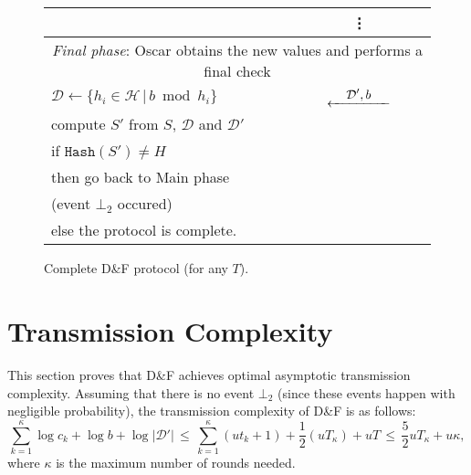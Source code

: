 \documentclass[twoside,envcountsame,runningheads]{llncs}
\newcommand{\Set}{\mathcal{H}}
\newcommand{\SetD}{\mathcal{D}}
\newcommand{\df}{D\&F\xspace}
\newcommand{\Hash}{\ensuremath{\mathtt{Hash}}}
\newcommand{\Lflow}[1]{\stackrel{\displaystyle #1}{\hbox to 5em{\leftarrowfill}}}
\newcommand{\apref}[1]{Appendix~\ref{#1}}
\newcommand{\apref}[1]{the full version~TODO}
\begin{document}
\begin{figure}[t]
\begin{tabular}{p{}cp{}}
 & \vdots & \\
\midrule
\multicolumn{3}{c}{\textit{Final phase}: Oscar obtains the new values and performs a final check } \\
\midrule
$\SetD \gets \{ h_i \in \Set \,|\, b \bmod h_i \}$ & $\Lflow{\SetD',b}$  & \\
compute $S'$ from $S$, $\SetD$ and $\SetD'$ & & \\
if $\Hash(S') \neq H$ & & \\
\hspace{0.2cm} then go back to Main phase && \\
\hspace{0.4cm} (event $\bot_2$ occured) & & \\
\hspace{0.2cm} else the protocol is complete. & & \\
\bottomrule
\end{tabular}\vspace{-0.25cm} %
\caption{Complete \df protocol (for any $T$).}
\label{fig:complete-df}
\end{figure}


\section{Transmission Complexity}
\label{sec:trans}

This section proves that \df achieves optimal asymptotic transmission complexity.%
%
%
Assuming that there is no event $\bot_2$ (since these events happen with negligible probability), the transmission complexity of \df is as follows:
\[  \sum_{k=1}^\kappa \log c_k + \log b + \log |\SetD'|
 \,\leq\, \sum_{k=1}^\kappa (ut_k+1) + \frac{1}{2} (uT_\kappa) + u T
 \,\leq\, \frac{5}{2} u T_\kappa + u \kappa, \]
where $\kappa$ is the maximum number of rounds needed.
\end{document}
